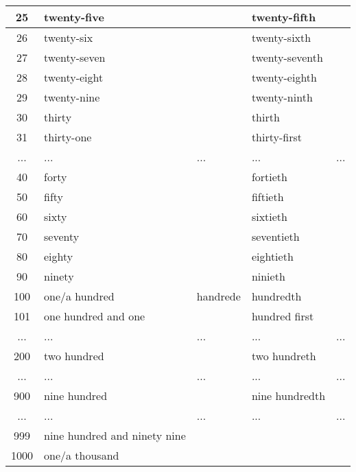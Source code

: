 \documentclass{book}
\begin{document}
\begin{center}
\begin{tabular}{ |c|p{3cm}|p{3cm}|p{3cm}|p{3cm}| }
    25& 	twenty-five& 	& twenty-fifth& \\
    \hline
    26& 	twenty-six& 	& twenty-sixth& \\
    \hline
    27& 	twenty-seven& 	& twenty-seventh& \\
    \hline
    28& 	twenty-eight& 	& twenty-eighth& \\
    \hline
    29& 	twenty-nine& 	& twenty-ninth& \\
    \hline
    30& 	thirty& 	& thirth& \\
    \hline
    31&         thirty-one&     & thirty-first& \\
    \hline
    ...& ...& ...& ...& ... \\
    \hline
    40&         forty&          & fortieth& \\
    \hline
    50&         fifty&          & fiftieth& \\
    \hline
    60&         sixty&          & sixtieth& \\
    \hline
    70&         seventy&        & seventieth& \\
    \hline
    80&         eighty&         & eightieth& \\
    \hline
    90&         ninety&         & ninieth& \\
    \hline
    100&        one/a hundred& handrede& hundredth& \\
    \hline
    101&        one hundred and one& & hundred first& \\
    \hline
    ...& ...& ...& ...& ... \\
    \hline
    200&        two hundred& & two hundreth& \\
    \hline
    ...& ...& ...& ...& ... \\
    \hline
    900&        nine hundred& & nine hundredth& \\
    \hline
    ...& ...& ...& ...& ... \\
    \hline    
    999&        nine hundred and ninety nine& & & \\
    \hline
    1000&       one/a thousand& & & \\
    \hline
  \end{tabular}
\end{center}
\end{document}
